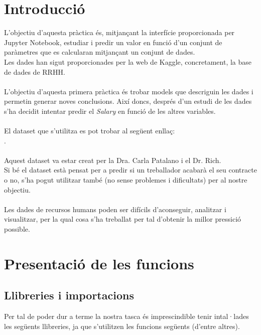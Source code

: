 \documentclass[a4paper, 11pt]{article}
\begin{document}
\section{Introducció}
L'objectiu d'aquesta pràctica és, mitjançant la interfície proporcionada per Jupyter Notebook, estudiar i predir un valor en funció d'un conjunt de paràmetres que es calcularan mitjançant un conjunt de dades. \\
Les dades han sigut proporcionades per la web de Kaggle, concretament, la base de dades de RRHH.\\\\
L'objectiu d'aquesta primera pràctica és trobar models que descriguin les dades i permetin generar noves conclusions. Així doncs, després d'un estudi de les dades s'ha decidit intentar predir el \textit{Salary} en funció de les altres variables.\\
\\
El dataset que s'utilitza es pot trobar al següent enllaç: \\ . \\\\
Aquest dataset va estar creat per la Dra. Carla Patalano i el Dr. Rich.\\
Si bé el dataset està pensat per a predir si un treballador acabarà el seu contracte o no, s'ha pogut utilitzar també (no sense problemes i dificultats) per al nostre objectiu.\\\\
Les dades de recursos humans poden ser difícils d'aconseguir, analitzar i visualitzar, per la qual cosa s'ha treballat per tal d'obtenir la millor pressició possible.\\
\newpage


\section{Presentació de les funcions}
\subsection{Llibreries i importacions} \label{imports}
Per tal de poder dur a terme la nostra tasca és imprescindible tenir intal·lades les següents llibreries, ja que s'utilitzen les funcions següents (d'entre altres).
\end{document}
